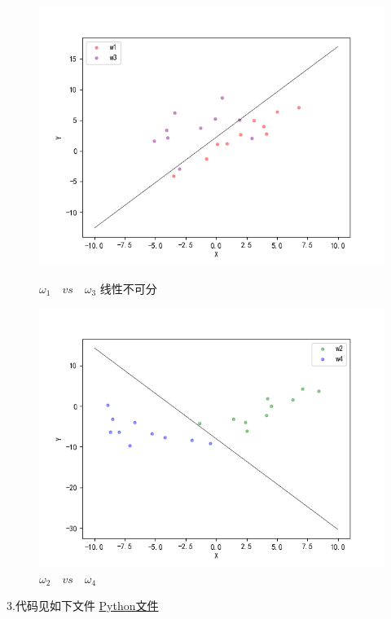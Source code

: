 \documentclass[a4paper,11pt,onecolumn,oneside,UTF8]{article}
\begin{document}
\begin{figure}[H]
    \begin{minipage}[t]{0.5\linewidth}
        \centering
        \includegraphics[width=\textwidth]{hw3_5.png}
        \caption{ $\omega_1 \quad vs\quad \omega_3$ 线性不可分 }
    \end{minipage}%
    \begin{minipage}[t]{0.5\linewidth}
        \centering
        \includegraphics[width=\textwidth]{hw3_6.png}
        \caption{ $\omega_2 \quad vs\quad \omega_4$ }
    \end{minipage}
\end{figure}

3.代码见如下文件
\href{./hw3.py}{Python文件}
\end{document}
